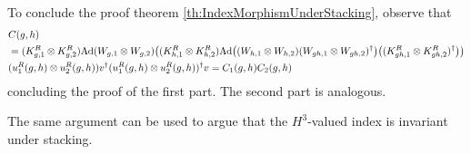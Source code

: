 \documentclass[11pt,a4paper,twoside]{article}
\numberwithin{equation}{section}
\begin{document}
	To conclude the proof theorem \ref{th:IndexMorphismUnderStacking}, observe that
	\begin{align}
		&C(g,h)\\
		\nonumber
		&=(K_{g,1}^R\otimes K_{g,2}^R)\Ad{W_{g,1}\otimes W_{g,2}}\left((K_{h,1}^R\otimes K_{h,2}^R)\Ad{(W_{h,1}\otimes W_{h,2})(W_{gh,1}\otimes W_{gh,2})^\dagger}\left((K_{gh,1}^R\otimes K_{gh,2}^R)^\dagger\right)\right)\\
		&(u^R_1(g,h)\otimes u^R_2(g,h))v^\dagger (u^R_1(g,h)\otimes u^R_2(g,h))^\dagger v=C_1(g,h)C_2(g,h)
	\end{align}
	concluding the proof of the first part. The second part is analogous.
	\begin{remark}\label{rem:StackingH3ValuedIndex}
		The same argument can be used to argue that the $H^3$-valued index is invariant under stacking.
	\end{remark}
\end{document}
